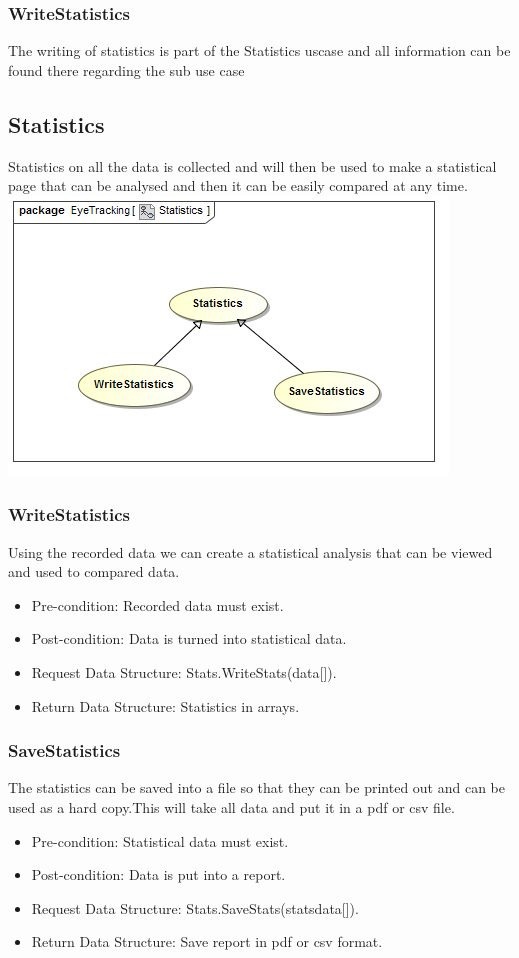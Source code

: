 	\subsubsection{WriteStatistics}
The writing of statistics is part of the Statistics uscase and all information can be found there regarding the sub use case
	
	
\subsection{Statistics}
Statistics on all the data is collected and will then be used to make a statistical page that can be analysed and then it can be easily compared at any time.
	\includegraphics[scale=0.5]{Diagrams/Use_Case_Diagram__Statistics.png}
	
		\subsubsection{WriteStatistics}
Using the recorded data we can create a statistical analysis that can be viewed and used to compared data.
\begin{itemize}
\item Pre-condition: Recorded data must exist.
\item Post-condition: Data is turned into statistical data.
\item Request Data Structure: Stats.WriteStats(data[]).
\item Return Data Structure: Statistics in arrays.
\end{itemize}

		\subsubsection{SaveStatistics}
The statistics can be saved into a file so that they can be printed out and can be used as a hard copy.This will take all data and put it in a pdf or csv file.
\begin{itemize}
\item Pre-condition: Statistical data must exist.
\item Post-condition: Data is put into a report.
\item Request Data Structure: Stats.SaveStats(statsdata[]).
\item Return Data Structure: Save report in pdf or csv format.
\end{itemize}
	
